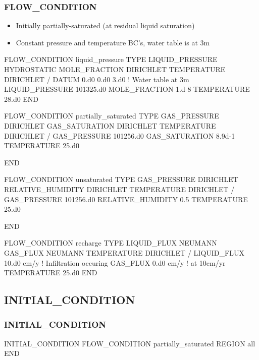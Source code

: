 \documentclass{beamer}
\newcommand\bluecomment[1]{{{\color{blue} #1}}}
\begin{document}
\begin{frame}\frametitle{FLOW\_CONDITION}

\begin{itemize}
\item Initially partially-saturated (at residual liquid saturation)
\item Constant pressure and temperature BC's, water table is at 3m
\end{itemize}

\begin{semiverbatim}
FLOW_CONDITION liquid_pressure
  TYPE
    LIQUID_PRESSURE HYDROSTATIC
    MOLE_FRACTION DIRICHLET
    TEMPERATURE DIRICHLET
  /
  DATUM 0.d0 0.d0 3.d0 \bluecomment{! Water table at 3m}
  LIQUID_PRESSURE 101325.d0
  MOLE_FRACTION 1.d-8
  TEMPERATURE 28.d0
END

\newpage
FLOW_CONDITION partially_saturated
  TYPE
    GAS_PRESSURE DIRICHLET
    GAS_SATURATION DIRICHLET
    TEMPERATURE DIRICHLET
  /
  GAS_PRESSURE 101256.d0
  GAS_SATURATION 8.9d-1 
  TEMPERATURE 25.d0

END

\newpage
FLOW_CONDITION unsaturated
  TYPE
    GAS_PRESSURE DIRICHLET
    RELATIVE_HUMIDITY DIRICHLET
    TEMPERATURE DIRICHLET
  /
  GAS_PRESSURE 101256.d0
  RELATIVE_HUMIDITY 0.5
  TEMPERATURE 25.d0

END

\newpage
FLOW_CONDITION recharge
  TYPE
    LIQUID_FLUX NEUMANN
    GAS_FLUX NEUMANN
    TEMPERATURE DIRICHLET
  /
  LIQUID_FLUX 10.d0 cm/y \bluecomment{! Infiltration occuring}
  GAS_FLUX 0.d0 cm/y     \bluecomment{! at 10cm/yr}
  TEMPERATURE 25.d0
END

\end{semiverbatim}

\end{frame}

\subsection{INITIAL\_CONDITION}

\begin{frame}[fragile]\frametitle{INITIAL\_CONDITION}

\begin{semiverbatim}
INITIAL_CONDITION
  FLOW_CONDITION partially_saturated 
  REGION all
END
\end{semiverbatim}

\end{frame}
\end{document}
